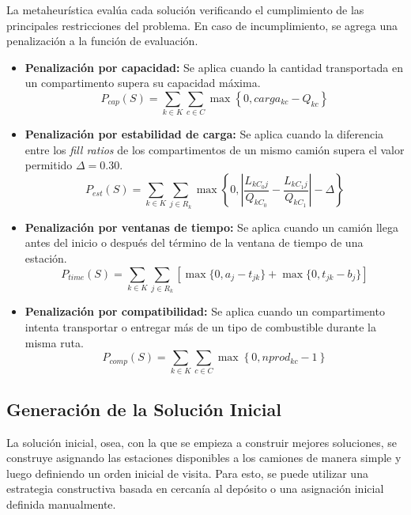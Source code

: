 La metaheurística evalúa cada solución verificando el cumplimiento de las principales restricciones del problema. En caso de incumplimiento, se agrega una penalización a la función de evaluación.

\begin{itemize}
    \item \textbf{Penalización por capacidad:} Se aplica cuando la cantidad transportada en un compartimento supera su capacidad máxima.
    \begin{equation}
    P_{cap}(S) = \sum_{k \in K} \sum_{c \in C} 
    \max \left\{0, carga_{kc} - Q_{kc} \right\}
    \end{equation}

    \item \textbf{Penalización por estabilidad de carga:} Se aplica cuando la diferencia entre los \textit{fill ratios} de los compartimentos de un mismo camión supera el valor permitido $\Delta = 0.30$.
    \begin{equation}
    P_{est}(S) = \sum_{k \in K} \sum_{j \in R_k}
    \max \left\{0,
    \left| \frac{L_{kC_0j}}{Q_{kC_0}} -
    \frac{L_{kC_1j}}{Q_{kC_1}} \right| - \Delta
    \right\}
    \end{equation}

    \item \textbf{Penalización por ventanas de tiempo:} Se aplica cuando un camión llega antes del inicio o después del término de la ventana de tiempo de una estación.
    \begin{equation}
    P_{time}(S) = \sum_{k \in K} \sum_{j \in R_k}
    \left[
    \max \{0, a_j - t_{jk} \}
    +
    \max \{0, t_{jk} - b_j \}
    \right]
    \end{equation}

    \item \textbf{Penalización por compatibilidad:} Se aplica cuando un compartimento intenta transportar o entregar más de un tipo de combustible durante la misma ruta.
    \begin{equation}
    P_{comp}(S) =
    \sum_{k \in K} \sum_{c \in C}
    \max \left\{0, nprod_{kc} - 1 \right\}
    \end{equation}
\end{itemize}

\subsection{Generación de la Solución Inicial}

La solución inicial, osea, con la que se empieza a construir mejores soluciones, se construye asignando las estaciones disponibles a los camiones de manera simple y luego definiendo un orden inicial de visita. Para esto, se puede utilizar una estrategia constructiva basada en cercanía al depósito o una asignación inicial definida manualmente.

